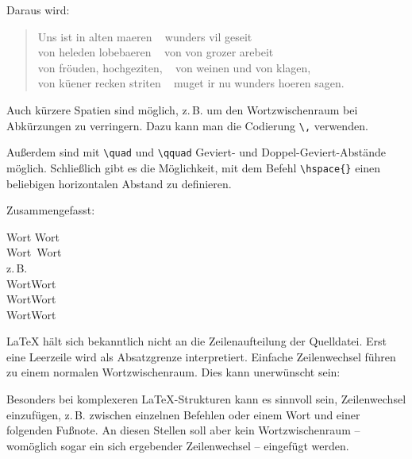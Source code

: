 Daraus wird:

\begin{lfgwprint}{}
 \begin{verse}
 Uns ist in alten maeren ~ wunders vil geseit\\
 von heleden lobebaeren ~ von von grozer arebeit\\
 von fröuden, hochgeziten, ~ von weinen und von klagen,\\
 von küener recken striten ~ muget ir nu wunders hoeren sagen.
 \end{verse}
\end{lfgwprint}

Auch kürzere Spatien sind möglich, z.\,B. um den Wortzwischenraum bei Abkürzungen zu verringern.
Dazu kann man die Codierung \lstinline/\,/ verwenden.

Außerdem sind mit \lstinline/\quad/ und \lstinline/\qquad/ Geviert- und Doppel-Geviert-Abstände
möglich.
Schließlich gibt es die Möglichkeit, mit dem Befehl \lstinline/\hspace{}/ einen beliebigen
horizontalen Abstand zu definieren.

Zusammengefasst:

\begin{lfgwexample}{}
Wort Wort\\	            %
Wort~Wort\\             %
z.\,B.\\		        %
Wort\quad Wort\\        %
Wort\qquad Wort\\       %
Wort\hspace{20mm}Wort\\ %
\end{lfgwexample}    



\LaTeX{} hält sich bekanntlich nicht an die Zeilenaufteilung der Quelldatei. Erst eine Leerzeile
wird als Absatzgrenze interpretiert. Einfache Zeilenwechsel führen zu einem normalen 
Wortzwischenraum. Dies kann unerwünscht sein:

Besonders bei komplexeren \LaTeX -Strukturen kann es sinnvoll sein, Zeilenwechsel einzufügen,
z.\,B. zwischen einzelnen Befehlen oder einem Wort und einer folgenden Fußnote.
An diesen Stellen soll aber kein Wortzwischenraum -- womöglich sogar ein sich ergebender 
Zeilenwechsel -- eingefügt werden.

